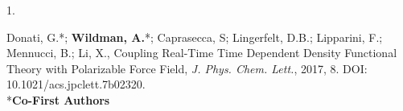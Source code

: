 \begin{cvpublications}

\cvpublication
{1.}
{\parbox[t]{0.95\textwidth}{\strut Donati, G.*; \textbf{Wildman, A.}*; Caprasecca, S; Lingerfelt, D.B.; Lipparini,
F.; Mennucci, B.; Li, X., Coupling Real-Time Time Dependent Density Functional
Theory with Polarizable Force Field, \textit{J. Phys. Chem. Lett.}, 2017, 8.
DOI: 10.1021/acs.jpclett.7b02320. \\ \**\textbf{Co-First Authors}}}



\end{cvpublications}
\vspace{-1cm}

